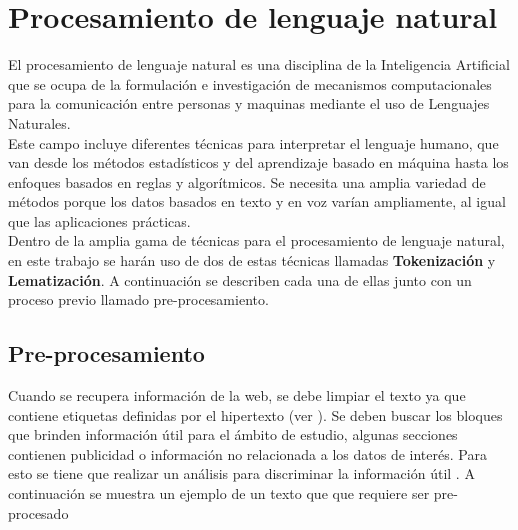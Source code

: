 
\section{Procesamiento de lenguaje natural}

El procesamiento de lenguaje natural es una disciplina de la Inteligencia Artificial que se ocupa de la formulación e 
investigación de mecanismos computacionales para la comunicación entre personas y maquinas mediante el uso de Lenguajes 
Naturales.\\

Este campo incluye diferentes técnicas para interpretar el lenguaje humano, que van desde los métodos 
estadísticos y del aprendizaje basado en máquina hasta los enfoques basados en reglas y algorítmicos. Se necesita una amplia variedad 
de métodos porque los datos basados en texto y en voz varían ampliamente, al igual que las aplicaciones prácticas.\\

Dentro de la amplia gama de técnicas para el procesamiento de lenguaje natural, en este trabajo se harán uso de dos de estas técnicas llamadas \textbf{Tokenización} y \textbf{Lematización}. A continuación se describen cada una de ellas junto con un proceso previo llamado pre-procesamiento.\\



\subsection[Pre-procesamiento]{Pre-procesamiento}


Cuando se recupera  información de la web, se debe limpiar el texto ya que contiene etiquetas definidas por el hipertexto (ver ). Se deben buscar los bloques que brinden información útil para el ámbito de estudio, algunas secciones contienen publicidad o información no relacionada a los datos de interés. Para esto se tiene que realizar un análisis para discriminar la información útil \citep{CD1}. A continuación se muestra un ejemplo de un texto que que requiere ser pre-procesado\\

